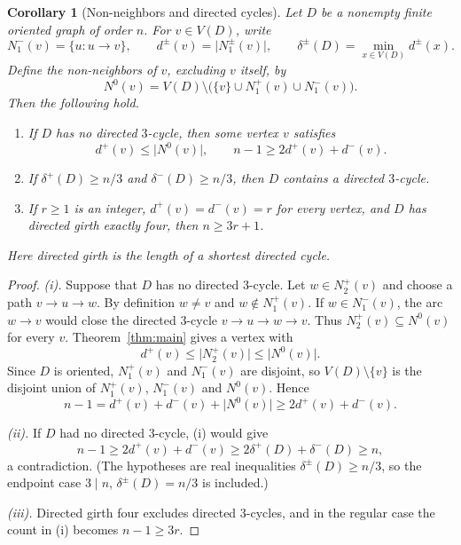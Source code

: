 \documentclass[11pt]{article}
\newtheorem{corollary}[theorem]{Corollary}
\theoremstyle{remark}
\newcommand{\abs}[1]{\lvert #1\rvert}
\begin{document}
\begin{corollary}[Non-neighbors and directed cycles]\label{cor:directed-cycle-consequences}
Let \(D\) be a nonempty finite oriented graph of order \(n\).  For
\(v\in V(D)\), write
\[
 N_1^-(v)=\{u:u\to v\},\qquad
 d^\pm(v)=\abs{N_1^\pm(v)},\qquad
 \delta^\pm(D)=\min_{x\in V(D)}d^\pm(x).
\]
Define the non-neighbors of \(v\), excluding \(v\) itself, by
\[
 N^0(v)=V(D)\setminus
 \bigl(\{v\}\cup N_1^+(v)\cup N_1^-(v)\bigr).
\]
Then the following hold.
\begin{enumerate}[label=\textup{(\roman*)}]
\item If \(D\) has no directed \(3\)-cycle, then some vertex \(v\) satisfies
\[
 d^+(v)\leq\abs{N^0(v)},\qquad
 n-1\geq 2d^+(v)+d^-(v).
\]
\item If \(\delta^+(D)\geq n/3\) and \(\delta^-(D)\geq n/3\), then \(D\)
contains a directed \(3\)-cycle.
\item If \(r\geq1\) is an integer, \(d^+(v)=d^-(v)=r\) for every vertex,
and \(D\) has directed girth exactly four, then \(n\geq3r+1\).
\end{enumerate}
Here directed girth is the length of a shortest directed cycle.
\end{corollary}

\begin{proof}
\emph{\textup{(i)}.}  Suppose that \(D\) has no directed \(3\)-cycle.
Let \(w\in N_2^+(v)\) and choose a path \(v\to u\to w\).  By definition
\(w\ne v\) and \(w\notin N_1^+(v)\).  If \(w\in N_1^-(v)\), the arc
\(w\to v\) would close the directed \(3\)-cycle $v\to u\to w\to v$.  Thus
\(N_2^+(v)\subseteq N^0(v)\) for every \(v\).  Theorem~\ref{thm:main}
gives a vertex with
\[
 d^+(v)\leq\abs{N_2^+(v)}\leq\abs{N^0(v)}.
\]
Since \(D\) is oriented, $N_1^+(v)$ and $N_1^-(v)$ are disjoint, so
$V(D)\setminus\{v\}$ is the disjoint union of $N_1^+(v)$, $N_1^-(v)$ and
$N^0(v)$.  Hence
\[
 n-1=d^+(v)+d^-(v)+\abs{N^0(v)}
 \geq 2d^+(v)+d^-(v).
\]

\emph{\textup{(ii)}.}  If $D$ had no directed \(3\)-cycle, \textup{(i)}
would give
\[
 n-1\geq2d^+(v)+d^-(v)\geq2\delta^+(D)+\delta^-(D)\geq n,
\]
a contradiction.  (The hypotheses are real inequalities
$\delta^\pm(D)\ge n/3$, so the endpoint case $3\mid n$,
$\delta^\pm(D)=n/3$ is included.)

\emph{\textup{(iii)}.}  Directed girth four excludes directed
\(3\)-cycles, and in the regular case the count in \textup{(i)} becomes
\(n-1\geq3r\).
\end{proof}
\end{document}
